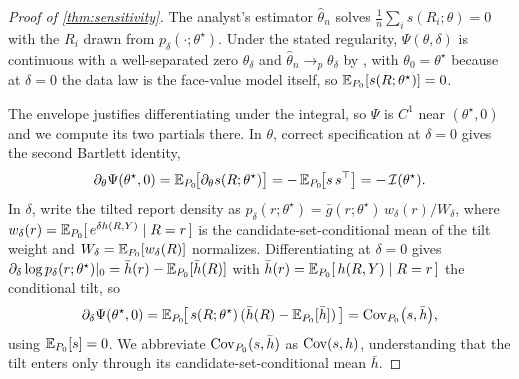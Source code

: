 \begin{proof}[Proof of \cref{thm:sensitivity}]
The analyst's estimator $\hat\theta_n$ solves $\frac1n \sum_i s(R_i; \theta) = 0$
with the $R_i$ drawn from $p_\delta(\cdot; \theta^\star)$. Under the stated
regularity, $\Psi(\theta, \delta)$ is continuous with a well-separated zero
$\theta_\delta$ and $\hat\theta_n \to_p \theta_\delta$ by
\citet[Thm~5.9]{vandervaart1998asymptotic}, with $\theta_0 = \theta^\star$ because at
$\delta = 0$ the data law is the face-value model itself, so $\mathbb{E}_{P_0}[s(R;
\theta^\star)] = 0$.

The envelope justifies differentiating under the integral, so $\Psi$ is $C^1$ near
$(\theta^\star, 0)$ and we compute its two partials there. In $\theta$, correct
specification at $\delta = 0$ gives the second Bartlett identity,
\begin{equation}
  \partial_\theta \Psi(\theta^\star, 0)
  = \mathbb{E}_{P_0}\!\big[\partial_\theta s(R; \theta^\star)\big]
  = -\,\mathbb{E}_{P_0}\!\big[s\, s^\top\big]
  = -\,\mathcal{I}(\theta^\star).
  \label{eq:app-bartlett}
\end{equation}
In $\delta$, write the tilted report density as $p_\delta(r; \theta^\star) = \bar
g(r; \theta^\star)\, w_\delta(r) / W_\delta$, where $w_\delta(r) = \mathbb{E}_{P_0}[\,
e^{\delta h(R, Y)} \mid R = r\,]$ is the candidate-set-conditional mean of the tilt
weight and $W_\delta = \mathbb{E}_{P_0}[w_\delta(R)]$ normalizes. Differentiating at $\delta
= 0$ gives $\partial_\delta \log p_\delta(r; \theta^\star)|_0 = \bar h(r) -
\mathbb{E}_{P_0}[\bar h(R)]$ with $\bar h(r) = \mathbb{E}_{P_0}[\, h(R, Y) \mid R = r\,]$ the
conditional tilt, so
\begin{equation}
  \partial_\delta \Psi(\theta^\star, 0)
  = \mathbb{E}_{P_0}\!\big[\, s(R; \theta^\star)\,(\bar h(R) - \mathbb{E}_{P_0}[\bar h])\,\big]
  = \operatorname{Cov}_{P_0}\!\big(s, \bar h\big),
  \label{eq:app-deltapartial}
\end{equation}
using $\mathbb{E}_{P_0}[s] = 0$. We abbreviate $\operatorname{Cov}_{P_0}(s, \bar h)$ as $\operatorname{Cov}(s, h)$,
understanding that the tilt enters only through its candidate-set-conditional mean
$\bar h$.


\end{proof}
